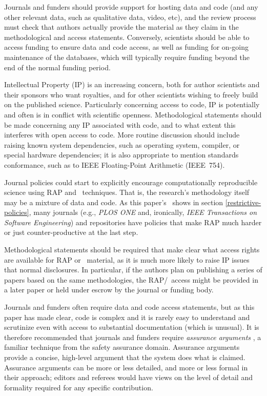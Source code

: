 \documentclass{comjnl}
\begin{document}
Journals and funders should provide support for hosting data and code (and any other relevant data, such as qualitative data, video, etc), and the review process must check that authors actually provide the material as they claim in the methodological and access statements. Conversely, scientists should be able to access funding to ensure data and code access, as well as funding for on-going maintenance of the databases, which will typically require funding beyond the end of the normal funding period.

Intellectual Property (IP) is an increasing concern, both for author scientists and their sponsors who want royalties, and for other scientists wishing to freely build on the published science. Particularly concerning access to code, IP is potentially and often is in conflict with scientific openness. Methodological statements should be made concerning any IP associated with code, and to what extent this interferes with open access to code. More routine discussion should include raising known system dependencies, such as operating system, compiler, or special hardware dependencies; it is also appropriate to mention standards conformance, such as to IEEE Floating-Point Arithmetic (IEEE~754).

\label{mentionPLOSandIEEE}
Journal policies could start to explicitly encourage computationally reproducible science using RAP and \RAPstar\ techniques. That is, the research's methodology itself may be a mixture of data and code. As this paper's \supplement\ shows in section \ref{restrictive-policies}, many journals (e.g., \emph{PLOS ONE\/} and, ironically, \emph{IEEE Transactions on Software Engineering\/}) and repositories have policies that make RAP much harder or just counter-productive at the last step. 

Methodological statements should be required that make clear what access rights are available for RAP or \RAPstar\ material, as it is much more likely to raise IP issues that normal disclosures. In particular, if the authors plan on publishing a series of papers based on the same methodologies, the RAP/\RAPstar\ access might be provided in a later paper or held under escrow by the journal or funding body.

Journals and funders often require data and code access statements, but as this paper has made clear, code is complex and it is rarely easy to understand and scrutinize even with access to substantial documentation (which is unusual). It is therefore recommended that journals and funders require \emph{assurance arguments} \cite{assurance-case}, a familiar technique from the safety assurance domain. Assurance arguments provide a concise, high-level argument that the system does what is claimed. Assurance arguments can be more or less detailed, and more or less formal in their approach; editors and referees would have views on the level of detail and formality required for any specific contribution.
\end{document}
